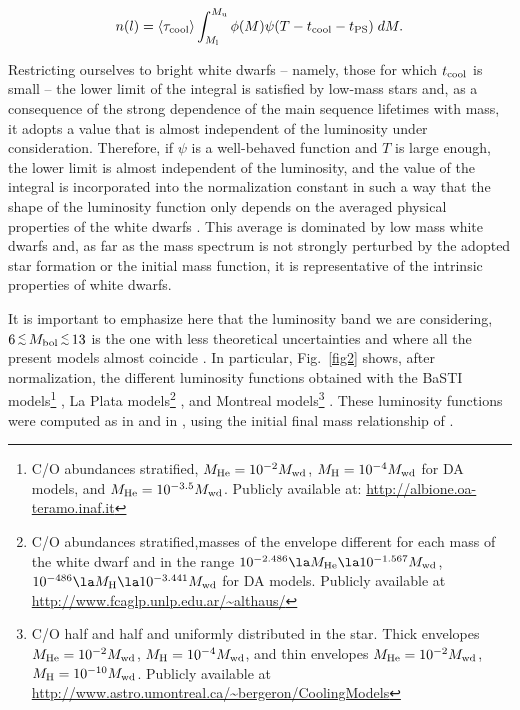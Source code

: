 \documentclass[useAMS,usenatbib]{mnras}
\newcommand{\lppr}{\stackrel{<}{\scriptstyle \sim}}
\newcommand{\lappr}{\raisebox{-0.4ex}{$\lppr$}}
\begin{document}
\begin{equation}
n(l) = \left\langle\tau_{\rm cool}\right\rangle 
\int_{M_{\rm l}}^{M_{\rm u}}\phi(M)
\psi(T-t_{\rm cool}-t_{\rm PS})\;dM.
\label{lf1} 
\end{equation}

Restricting  ourselves to  bright white  dwarfs --  namely, those  for
which $t_{\rm  cool}$ is small --  the lower limit of  the integral is
satisfied  by low-mass  stars  and,  as a  consequence  of the  strong
dependence of the main sequence lifetimes with mass, it adopts a value
that  is almost  independent  of the  luminosity under  consideration.
Therefore,  if $\psi$  is a  well-behaved  function and  $T$ is  large
enough,  the lower limit is almost independent of the luminosity, 
and the value of the integral is incorporated  into  the normalization  
constant  in such a way that  the shape  of  the
luminosity function  only depends on the  averaged physical properties
of the white dwarfs \citep{iser08,iser09}.  This average is dominated by low mass white dwarfs and, as far as the mass spectrum is not strongly perturbed by the adopted star formation or the initial mass function, it is representative of the intrinsic properties of white dwarfs. 

It is important to emphasize here that the luminosity band we are considering,
 $6\, \lappr \, M_{\rm bol} \, \lappr\, 13$ is the one with less theoretical 
uncertainties and where all the present models almost coincide \citep{hans03}. In 
particular, Fig.~\ref{fig2} shows,  after normalization, the different luminosity functions obtained with the BaSTI models\footnote{C/O abundances stratified, $M_{\rm He}=10^{-2}M_{\rm wd}$, $M_{\rm H} = 10 ^{-4}M_{\rm wd}$ for DA models, and $M_{\rm He}=10^{-3.5}M_{\rm wd}$. Publicly available at: \url{http://albione.oa-teramo.inaf.it}} \citep{sala10}, 
La Plata models\footnote{C/O abundances stratified,masses of the envelope different for each mass of the white dwarf and in the range $10^{-2.486} \la M_{\rm He} \la 10^{-1.567}M_{\rm wd}$, $10^{-486} \la M_{\rm H} \la  10 ^{-3.441}M_{\rm wd}$ for DA models.
Publicly available at \url{http://www.fcaglp.unlp.edu.ar/~althaus/}} \citep{rene10}, 
and Montreal models\footnote{C/O  half and half and uniformly distributed in the star.
Thick envelopes $M_{\rm He}=10^{-2}M_{\rm wd}$, $M_{\rm H} = 10 ^{-4}M_{\rm wd}$, and thin envelopes $M_{\rm He}=10^{-2}M_{\rm wd}$, $M_{\rm H} = 10 ^{-10}M_{\rm wd}$. Publicly available at \url{http://www.astro.umontreal.ca/~bergeron/CoolingModels}} \citep{font01}.
These luminosity functions were computed  as in \citet{iser98} and in \citet{mill14}, using the initial final mass relationship of \citet{cata08}.
\end{document}
